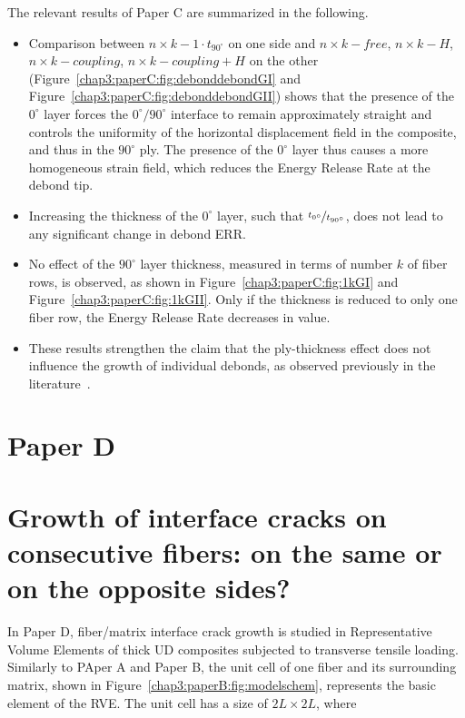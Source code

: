 The relevant results of Paper C are summarized in the following.

\begin{itemize}
\item Comparison between $n\times k-1\cdot t_{90^{\circ}}$ on one side and $n\times k-free$, $n\times k-H$, $n\times k-coupling$, $n\times k-coupling+H$ on the other (Figure~\ref{chap3:paperC:fig:debonddebondGI} and Figure~\ref{chap3:paperC:fig:debonddebondGII}) shows that the presence of the $0^{\circ}$ layer forces the $0^{\circ}/90^{\circ}$ interface to remain approximately straight and controls the uniformity of the horizontal displacement field in the composite, and thus in the $90^{\circ}$ ply. The presence of the $0^{\circ}$ layer thus causes a more homogeneous strain field, which reduces the Energy Release Rate at the debond tip.
\item Increasing the thickness of the $0^{\circ}$ layer, such that $\nicefrac{t_{0^{\circ}}}{t_{90^{\circ}}}$, does not lead to any significant change in debond ERR.
\item No effect of the $90^{\circ}$ layer thickness, measured in terms of number $k$ of fiber rows, is observed, as shown in Figure~\ref{chap3:paperC:fig:1kGI} and Figure~\ref{chap3:paperC:fig:1kGII}. Only if the thickness is reduced to only one fiber row, the Energy Release Rate decreases in value.
\item These results strengthen the claim that the ply-thickness effect does not influence the growth of individual debonds, as observed previously in the literature~\cite{Saito2012,Herraez2015,Velasco2018, Paris2018}.
\end{itemize}

\section{Paper D}
\section*{Growth of interface cracks on consecutive fibers: on the same or on the opposite sides?}

In Paper D, fiber/matrix interface crack growth is studied in Representative Volume Elements of thick UD composites subjected to transverse tensile loading. Similarly to PAper A and Paper B, the unit cell of one fiber and its surrounding matrix, shown in Figure~\ref{chap3:paperB:fig:modelschem}, represents the basic element of the RVE. The unit cell has a size of $2L\times2L$, where

